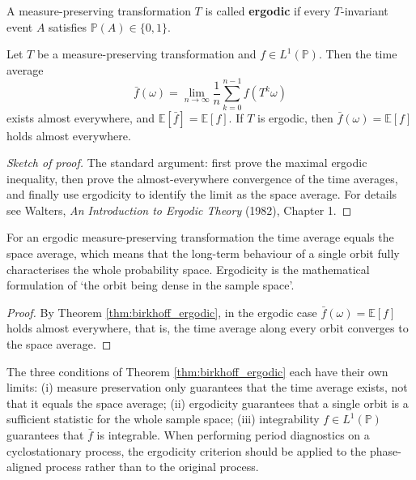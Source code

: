 \begin{definition}[Ergodicity]\label{def:ergodicity}
A measure-preserving transformation $T$ is called \textbf{ergodic} if every $T$-invariant event $A$ satisfies $\mathbb{P}(A) \in \{0, 1\}$.
\end{definition}

\begin{theorem}\label{thm:birkhoff_ergodic}
Let $T$ be a measure-preserving transformation and $f \in L^1(\mathbb{P})$. Then the time average
\[
\bar{f}(\omega) = \lim_{n \to \infty} \frac{1}{n} \sum_{k=0}^{n-1} f(T^k \omega)
\]
exists almost everywhere, and $\mathbb{E}[\bar{f}] = \mathbb{E}[f]$. If $T$ is ergodic, then $\bar{f}(\omega) = \mathbb{E}[f]$ holds almost everywhere.
\end{theorem}

\begin{proof}[Sketch of proof]
The standard argument: first prove the maximal ergodic inequality, then prove the almost-everywhere convergence of the time averages, and finally use ergodicity to identify the limit as the space average. For details see Walters, \emph{An Introduction to Ergodic Theory} (1982), Chapter 1.
\end{proof}

\begin{corollary}\label{cor:ergodic_closure}
For an ergodic measure-preserving transformation the time average equals the space average, which means that the long-term behaviour of a single orbit fully characterises the whole probability space. Ergodicity is the mathematical formulation of `the orbit being dense in the sample space'.
\end{corollary}

\begin{proof}
By Theorem \ref{thm:birkhoff_ergodic}, in the ergodic case $\bar{f}(\omega) = \mathbb{E}[f]$ holds almost everywhere, that is, the time average along every orbit converges to the space average.
\end{proof}

\begin{remark}\label{ch14_ergodic_scope_remark}
The three conditions of Theorem \ref{thm:birkhoff_ergodic} each have their own limits: (i) measure preservation only guarantees that the time average exists, not that it equals the space average; (ii) ergodicity guarantees that a single orbit is a sufficient statistic for the whole sample space; (iii) integrability $f \in L^1(\mathbb{P})$ guarantees that $\bar{f}$ is integrable. When performing period diagnostics on a cyclostationary process, the ergodicity criterion should be applied to the phase-aligned process rather than to the original process.
\end{remark}


